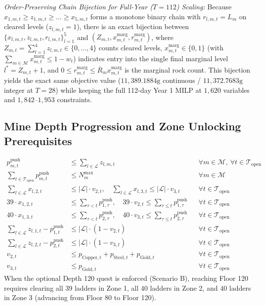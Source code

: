 \documentclass[11pt,a4paper]{article}
\begin{document}
\textit{Order-Preserving Chain Bijection for Full-Year ($T=112$) Scaling:} Because $x_{1,m,t} \ge z_{1,m,t} \ge \dots \ge x_{5,m,t}$ forms a monotone binary chain with $r_{l,m,t} = L_m$ on cleared levels ($z_{l,m,t}=1$), there is an exact bijection between $\{x_{l,m,t}, z_{l,m,t}, r_{l,m,t}\}_{l=1}^5$ and $(Z_{m,t}, x_{m,t}^{\text{marg}}, r_{m,t}^{\text{marg}})$, where $Z_{m,t} = \sum_{l=1}^4 z_{l,m,t} \in \{0,\dots,4\}$ counts cleared levels, $x_{m,t}^{\text{marg}} \in \{0,1\}$ (with $\sum_{m \in \mathcal{M}} x_{m,t}^{\text{marg}} \le 1 - w_t$) indicates entry into the single final marginal level $l^* = Z_{m,t}+1$, and $0 \le r_{m,t}^{\text{marg}} \le \overline{R}_m x_{m,t}^{\text{marg}}$ is the marginal rock count. This bijection yields the exact same objective value ($11,389.1884\text{g}$ continuous / $11,372.7683\text{g}$ integer at $T=28$) while keeping the full 112-day Year 1 MILP at $1,620$ variables and $1,842$--$1,953$ constraints.

\subsection{Mine Depth Progression and Zone Unlocking Prerequisites}
\begin{align}
    p_{m,t}^{\text{push}} &\le \sum_{l \in \mathcal{L}} z_{l,m,t} && \forall m \in \mathcal{M},\ \forall t \in \mathcal{T}_{\text{open}} \\
    \sum_{t \in \mathcal{T}_{\text{open}}} p_{m,t}^{\text{push}} &\le N_m^{\max} && \forall m \in \mathcal{M} \\
    \sum_{l \in \mathcal{L}} x_{l,2,t} &\le |\mathcal{L}| \cdot v_{2,t}, \quad \sum_{l \in \mathcal{L}} x_{l,3,t} \le |\mathcal{L}| \cdot v_{3,t} && \forall t \in \mathcal{T}_{\text{open}} \\
    39 \cdot x_{1,2,t} &\le \sum_{\tau < t} p_{1,\tau}^{\text{push}}, \quad 39 \cdot v_{2,t} \le \sum_{\tau \le t} p_{1,\tau}^{\text{push}} && \forall t \in \mathcal{T}_{\text{open}} \\
    40 \cdot x_{1,3,t} &\le \sum_{\tau < t} p_{2,\tau}^{\text{push}}, \quad 40 \cdot v_{3,t} \le \sum_{\tau \le t} p_{2,\tau}^{\text{push}} && \forall t \in \mathcal{T}_{\text{open}} \\
    \sum_{l \in \mathcal{L}} z_{l,1,t} - p_{1,t}^{\text{push}} &\le |\mathcal{L}| \cdot (1 - v_{2,t}) && \forall t \in \mathcal{T}_{\text{open}} \\
    \sum_{l \in \mathcal{L}} z_{l,2,t} - p_{2,t}^{\text{push}} &\le |\mathcal{L}| \cdot (1 - v_{3,t}) && \forall t \in \mathcal{T}_{\text{open}} \\
    v_{2,t} &\le p_{\text{Copper},t} + p_{\text{Steel},t} + p_{\text{Gold},t} && \forall t \in \mathcal{T}_{\text{open}} \\
    v_{3,t} &\le p_{\text{Gold},t} && \forall t \in \mathcal{T}_{\text{open}}
\end{align}
When the optional Depth 120 quest is enforced (Scenario B), reaching Floor 120 requires clearing all $39$ ladders in Zone 1, all $40$ ladders in Zone 2, and $40$ ladders in Zone 3 (advancing from Floor 80 to Floor 120).
\end{document}
